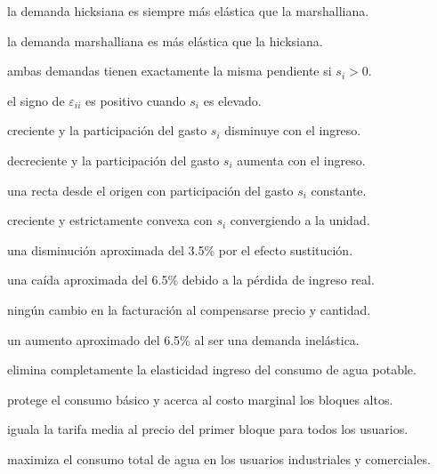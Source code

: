 \begin{opts}
    \item la demanda hicksiana es siempre más elástica que la marshalliana.
    \item la demanda marshalliana es más elástica que la hicksiana.
    \item ambas demandas tienen exactamente la misma pendiente si $s_i > 0$.
    \item el signo de $\varepsilon_{ii}$ es positivo cuando $s_i$ es elevado.
\end{opts}

\begin{opts}
    \item creciente y la participación del gasto $s_i$ disminuye con el ingreso.
    \item decreciente y la participación del gasto $s_i$ aumenta con el ingreso.
    \item una recta desde el origen con participación del gasto $s_i$ constante.
    \item creciente y estrictamente convexa con $s_i$ convergiendo a la unidad.
\end{opts}

\begin{opts}
    \item una disminución aproximada del 3.5\% por el efecto sustitución.
    \item una caída aproximada del 6.5\% debido a la pérdida de ingreso real.
    \item ningún cambio en la facturación al compensarse precio y cantidad.
    \item un aumento aproximado del 6.5\% al ser una demanda inelástica.
\end{opts}

\begin{opts}
    \item elimina completamente la elasticidad ingreso del consumo de agua potable.
    \item protege el consumo básico y acerca al costo marginal los bloques altos.
    \item iguala la tarifa media al precio del primer bloque para todos los usuarios.
    \item maximiza el consumo total de agua en los usuarios industriales y comerciales.
\end{opts}

